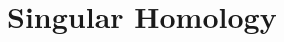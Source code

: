 \documentclass[../main.tex]{subfiles}
\begin{document}
\chapter{ Singular Homology }
\end{document}
